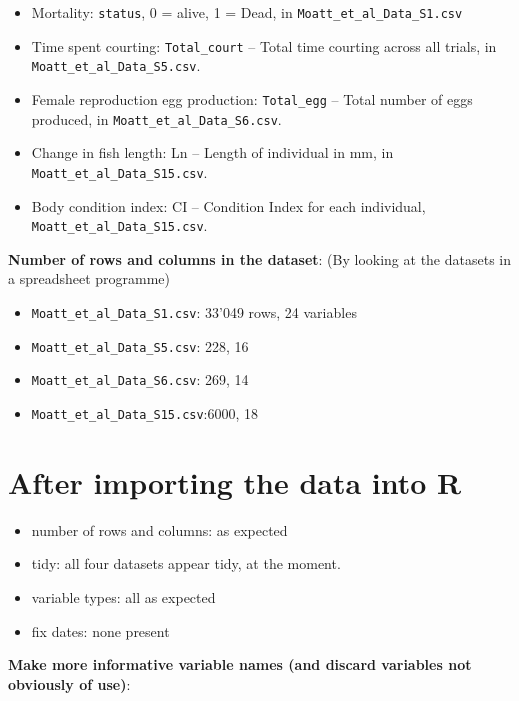 \documentclass[]{book}
\providecommand{\tightlist}{%
  \setlength{\itemsep}{0pt}\setlength{\parskip}{0pt}}
\begin{document}
\begin{itemize}
\tightlist
\item
  Mortality: \texttt{status}, 0 = alive, 1 = Dead, in \texttt{Moatt\_et\_al\_Data\_S1.csv}
\item
  Time spent courting: \texttt{Total\_court} -- Total time courting across all trials, in \texttt{Moatt\_et\_al\_Data\_S5.csv}.
\item
  Female reproduction egg production: \texttt{Total\_egg} -- Total number of eggs produced, in \texttt{Moatt\_et\_al\_Data\_S6.csv}.
\item
  Change in fish length: Ln -- Length of individual in mm, in \texttt{Moatt\_et\_al\_Data\_S15.csv}.
\item
  Body condition index: CI -- Condition Index for each individual, \texttt{Moatt\_et\_al\_Data\_S15.csv}.
\end{itemize}

\textbf{Number of rows and columns in the dataset}:
(By looking at the datasets in a spreadsheet programme)

\begin{itemize}
\tightlist
\item
  \texttt{Moatt\_et\_al\_Data\_S1.csv}: 33'049 rows, 24 variables
\item
  \texttt{Moatt\_et\_al\_Data\_S5.csv}: 228, 16
\item
  \texttt{Moatt\_et\_al\_Data\_S6.csv}: 269, 14
\item
  \texttt{Moatt\_et\_al\_Data\_S15.csv}:6000, 18
\end{itemize}

\hypertarget{after-importing-the-data-into-r}{%
\section{After importing the data into R}\label{after-importing-the-data-into-r}}

\begin{itemize}
\tightlist
\item
  number of rows and columns: as expected
\item
  tidy: all four datasets appear tidy, at the moment.
\item
  variable types: all as expected
\item
  fix dates: none present
\end{itemize}

\textbf{Make more informative variable names (and discard variables not obviously of use)}:
\end{document}
